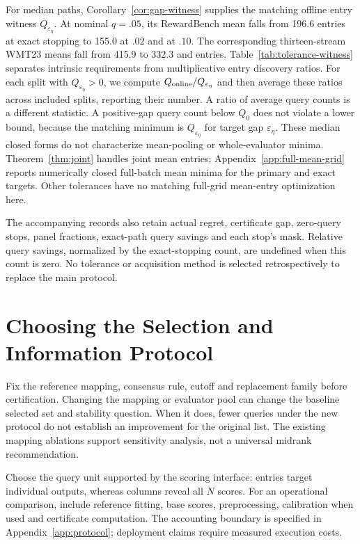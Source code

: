 For median paths, Corollary~\ref{cor:gap-witness} supplies the matching offline entry witness $Q_{\varepsilon_\eta}$. At nominal $q=.05$, its RewardBench mean falls from 196.6 entries at exact stopping to 155.0 at $.02$ and \toleranceRBten{} at $.10$. The corresponding thirteen-stream WMT23 means fall from 415.9 to 332.3 and \toleranceWMTten{} entries. Table~\ref{tab:tolerance-witness} separates intrinsic requirements from multiplicative entry discovery ratios. For each split with $Q_{\varepsilon_\eta}>0$, we compute $Q_{\rm online}/Q_{\varepsilon_\eta}$ and then average these ratios across included splits, reporting their number. A ratio of average query counts is a different statistic. A positive-gap query count below $Q_0$ does not violate a lower bound, because the matching minimum is $Q_{\varepsilon_\eta}$ for target gap $\varepsilon_\eta$. These median closed forms do not characterize mean-pooling or whole-evaluator minima. Theorem~\ref{thm:joint} handles joint mean entries; Appendix~\ref{app:full-mean-grid} reports numerically closed full-batch mean minima for the primary and exact targets. Other tolerances have no matching full-grid mean-entry optimization here.

The accompanying records also retain actual regret, certificate gap, zero-query stops, panel fractions, exact-path query savings and each stop's mask. Relative query savings, normalized by the exact-stopping count, are undefined when this count is zero. No tolerance or acquisition method is selected retrospectively to replace the main protocol.


\section{Choosing the Selection and Information Protocol}
\label{app:practical}
Fix the reference mapping, consensus rule, cutoff and replacement family before certification. Changing the mapping or evaluator pool can change the baseline selected set and stability question. When it does, fewer queries under the new protocol do not establish an improvement for the original list. The existing mapping ablations support sensitivity analysis, not a universal midrank recommendation.

Choose the query unit supported by the scoring interface: entries target individual outputs, whereas columns reveal all $N$ scores. For an operational comparison, include reference fitting, base scores, preprocessing, calibration when used and certificate computation. The accounting boundary is specified in Appendix~\ref{app:protocol}; deployment claims require measured execution costs.

